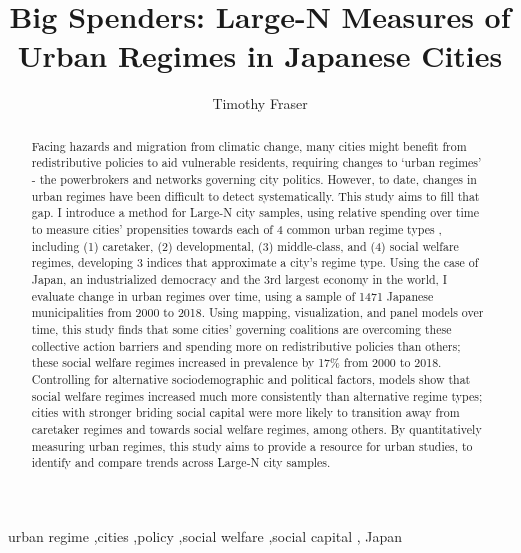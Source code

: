 \documentclass[preprint, 3p,
authoryear]{elsarticle} %
\begin{document}
\begin{frontmatter}

  \title{Big Spenders: Large-N Measures of Urban Regimes in Japanese
Cities}
    \author[Systems Engineering Program, Cornell University]{Timothy
Fraser%
  }
  
  \begin{abstract}
  Facing hazards and migration from climatic change, many cities might
  benefit from redistributive policies to aid vulnerable residents,
  requiring changes to `urban regimes' - the powerbrokers and networks
  governing city politics. However, to date, changes in urban regimes
  have been difficult to detect systematically. This study aims to fill
  that gap. I introduce a method for Large-N city samples, using
  relative spending over time to measure cities' propensities towards
  each of 4 common urban regime types \citeyearpar{stone_1993},
  including (1) caretaker, (2) developmental, (3) middle-class, and (4)
  social welfare regimes, developing 3 indices that approximate a city's
  regime type. Using the case of Japan, an industrialized democracy and
  the 3rd largest economy in the world, I evaluate change in urban
  regimes over time, using a sample of 1471 Japanese municipalities from
  2000 to 2018. Using mapping, visualization, and panel models over
  time, this study finds that some cities' governing coalitions are
  overcoming these collective action barriers and spending more on
  redistributive policies than others; these social welfare regimes
  increased in prevalence by 17\% from 2000 to 2018. Controlling for
  alternative sociodemographic and political factors, models show that
  social welfare regimes increased much more consistently than
  alternative regime types; cities with stronger briding social capital
  were more likely to transition away from caretaker regimes and towards
  social welfare regimes, among others. By quantitatively measuring
  urban regimes, this study aims to provide a resource for urban
  studies, to identify and compare trends across Large-N city samples.
  \end{abstract}
    \begin{keyword}
    urban regime \sep cities \sep policy \sep social welfare \sep social
capital \sep 
    Japan
  \end{keyword}
  
 \end{frontmatter}
\end{document}
